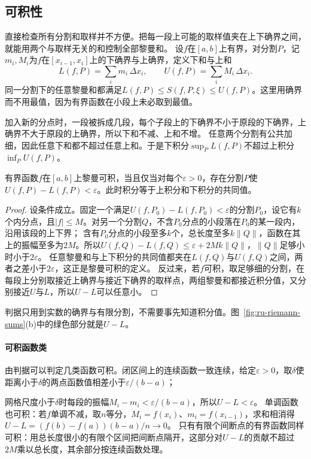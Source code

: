 \subsection{可积性}
\label{sec:ru-integrability}

直接检查所有分割和取样并不方便。把每一段上可能的取样值夹在上下确界之间，就能用两个与取样无关的和控制全部黎曼和。
设$f$在$[a,b]$上有界，对分割$P$，记$m_i,M_i$为$f$在$[x_{i-1},x_i]$上的下确界与上确界，定义下和与上和
\[
 L(f,P)=\sum_im_i\,\Delta x_i,\qquad U(f,P)=\sum_iM_i\,\Delta x_i.
\]
同一分割下的任意黎曼和都满足$L(f,P)\leq S(f,P,\xi)\leq U(f,P)$。这里用确界而不用最值，因为有界函数在小段上未必取到最值。

加入新的分点时，一段被拆成几段，每个子段上的下确界不小于原段的下确界，上确界不大于原段的上确界，所以下和不减、上和不增。
任意两个分割有公共加细，因此任意下和都不超过任意上和。于是下积分$\sup_PL(f,P)$不超过上积分$\inf_PU(f,P)$。
\begin{theorem}[Darboux判据]
\label{thm:ru-darboux-criterion}
有界函数$f$在$[a,b]$上黎曼可积，当且仅当对每个$\varepsilon>0$，存在分割$P$使$U(f,P)-L(f,P)<\varepsilon$。此时积分等于上积分和下积分的共同值。
\end{theorem}
\begin{proof}
设条件成立。固定一个满足$U(f,P_0)-L(f,P_0)<\varepsilon$的分割$P_0$，设它有$k$个内分点，且$|f|\leq M$。对另一个分割$Q$，不含$P_0$分点的小段落在$P_0$的某一段内，沿用该段的上下界；
含有$P_0$分点的小段至多$k$个，总长度至多$k\|Q\|$，函数在其上的振幅至多为$2M$。所以$U(f,Q)-L(f,Q)\leq\varepsilon+2Mk\|Q\|$，$\|Q\|$足够小时小于$2\varepsilon$。
任意黎曼和与上下积分的共同值都夹在$L(f,Q)$与$U(f,Q)$之间，两者之差小于$2\varepsilon$，这正是黎曼可积的定义。
反过来，若$f$可积，取足够细的分割，在每段上分别取接近上确界与接近下确界的取样点，两组黎曼和都接近积分值，又分别接近$U$与$L$，所以$U-L$可以任意小。
\end{proof}
判据只用到实数的确界与有限分割，不需要事先知道积分值。图~\ref{fig:ru-riemann-sums}(b)中的绿色部分就是$U-L$。

\paragraph{可积函数类}
由判据可以判定几类函数可积。闭区间上的连续函数一致连续，给定$\varepsilon>0$，取$\delta$使距离小于$\delta$的两点函数值相差小于$\varepsilon/(b-a)$；

网格尺度小于$\delta$时每段的振幅$M_i-m_i<\varepsilon/(b-a)$，所以$U-L<\varepsilon$。
单调函数也可积：若$f$单调不减，取$n$等分，$M_i=f(x_i)$、$m_i=f(x_{i-1})$，求和相消得$U-L=(f(b)-f(a))(b-a)/n\to0$。
只有有限个间断点的有界函数同样可积：用总长度很小的有限个区间把间断点隔开，这部分对$U-L$的贡献不超过$2M$乘以总长度，其余部分按连续函数处理。

